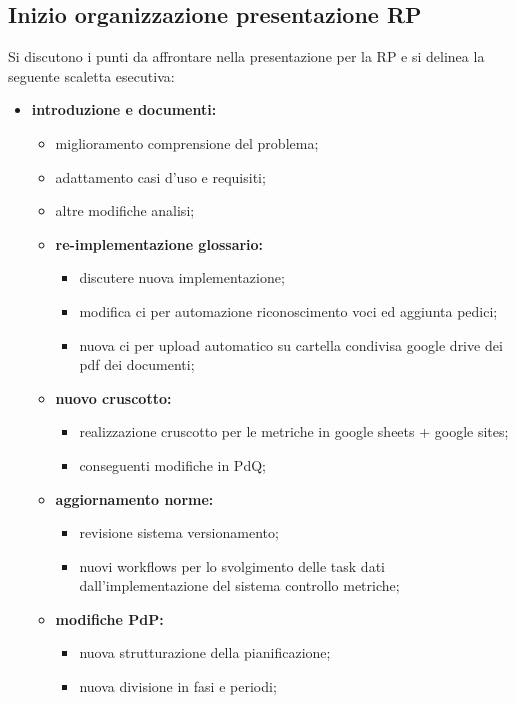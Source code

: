 \subsection{Inizio organizzazione presentazione RP}
\label{rp}
Si discutono i punti da affrontare nella presentazione per la RP e si delinea la seguente scaletta esecutiva:
\begin{itemize}
    \item \textbf{introduzione e documenti:}
    \begin{itemize}
        \item miglioramento comprensione del problema;
        \item adattamento casi d'uso e requisiti;
        \item altre modifiche analisi;
        \item \textbf{re-implementazione glossario:}
        \begin{itemize}
            \item discutere nuova implementazione;
            \item modifica ci per automazione riconoscimento voci ed aggiunta pedici;
            \item nuova ci per upload automatico su cartella condivisa google drive dei pdf dei documenti;
        \end{itemize}
        \item \textbf{nuovo cruscotto:}
        \begin{itemize}
            \item realizzazione cruscotto per le metriche in google sheets + google sites;
            \item conseguenti modifiche in PdQ;
        \end{itemize}
        \item \textbf{aggiornamento norme:}
        \begin{itemize}
            \item revisione sistema versionamento;
            \item nuovi workflows per lo svolgimento delle task dati dall'implementazione del sistema controllo metriche;
        \end{itemize}
        \item \textbf{modifiche PdP:}
        \begin{itemize}
            \item nuova strutturazione della pianificazione;
            \item nuova divisione in fasi e periodi;

\end{itemize}
\end{itemize}
\end{itemize}
